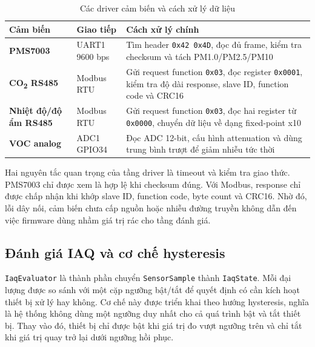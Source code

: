 \begin{table}[H]
    \centering
    \caption{Các driver cảm biến và cách xử lý dữ liệu}
    \begin{tabularx}{\textwidth}{>{\bfseries}l l X}
        \toprule
        Cảm biến & Giao tiếp & Cách xử lý chính \\
        \midrule
        PMS7003 & UART1 9600 bps & Tìm header \texttt{0x42 0x4D}, đọc đủ frame, kiểm tra checksum và tách PM1.0/PM2.5/PM10 \\
        CO\textsubscript{2} RS485 & Modbus RTU & Gửi request function \texttt{0x03}, đọc register \texttt{0x0001}, kiểm tra độ dài response, slave ID, function code và CRC16 \\
        Nhiệt độ/độ ẩm RS485 & Modbus RTU & Gửi request function \texttt{0x03}, đọc hai register từ \texttt{0x0000}, chuyển dữ liệu về dạng fixed-point x10 \\
        VOC analog & ADC1 GPIO34 & Đọc ADC 12-bit, cấu hình attenuation và dùng trung bình trượt để giảm nhiễu tức thời \\
        \bottomrule
    \end{tabularx}
\end{table}

Hai nguyên tắc quan trọng của tầng driver là timeout và kiểm tra giao thức. PMS7003 chỉ
được xem là hợp lệ khi checksum đúng. Với Modbus, response chỉ được chấp nhận khi khớp
slave ID, function code, byte count và CRC16. Nhờ đó, lỗi dây nối, cảm biến chưa cấp
nguồn hoặc nhiễu đường truyền không dẫn đến việc firmware dùng nhầm giá trị rác cho tầng
đánh giá.

\subsection{Đánh giá IAQ và cơ chế hysteresis}

\texttt{IaqEvaluator} là thành phần chuyển \texttt{SensorSample} thành \texttt{IaqState}.
Mỗi đại lượng được so sánh với một cặp ngưỡng bật/tắt để quyết định có cần kích hoạt
thiết bị xử lý hay không. Cơ chế này được triển khai theo hướng hysteresis, nghĩa là hệ
thống không dùng một ngưỡng duy nhất cho cả quá trình bật và tắt thiết bị. Thay vào đó,
thiết bị chỉ được bật khi giá trị đo vượt ngưỡng trên và chỉ tắt khi giá trị quay trở
lại dưới ngưỡng hồi phục.

